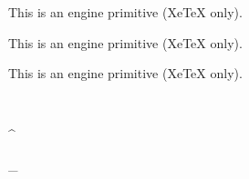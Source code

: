 \begin{function}[]
  {
    \XeTeXcharclass
  }
  \begin{syntax}
  \end{syntax}
  This is an engine primitive (Xe\TeX{} only).
\end{function}



\begin{function}[]
  {
    \XeTeXmathcode
  }
  \begin{syntax}
  \end{syntax}
  This is an engine primitive (Xe\TeX{} only).
\end{function}



\begin{function}[]
  {
    \XeTeXrevision
  }
  \begin{syntax}
  \end{syntax}
  This is an engine primitive (Xe\TeX{} only).
\end{function}



\begin{function}[]
  {
    \Z
  }
  \begin{syntax}
  \end{syntax}

\end{function}



\begin{function}[]
  {
    \\
  }
  \begin{syntax}
    \cs{\textbackslash}
  \end{syntax}

\end{function}



\begin{function}[]
  {
    \^
  }
  \begin{syntax}
  \end{syntax}

\end{function}



\begin{function}[]
  {
    \_
  }
  \begin{syntax}
    \cs{\_}
  \end{syntax}

\end{function}



